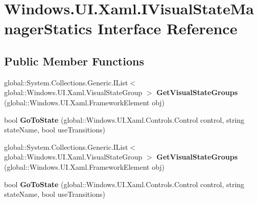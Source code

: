 \hypertarget{interface_windows_1_1_u_i_1_1_xaml_1_1_i_visual_state_manager_statics}{}\section{Windows.\+U\+I.\+Xaml.\+I\+Visual\+State\+Manager\+Statics Interface Reference}
\label{interface_windows_1_1_u_i_1_1_xaml_1_1_i_visual_state_manager_statics}
\subsection*{Public Member Functions}
\begin{DoxyCompactItemize}
\item 
\mbox{\label{interface_windows_1_1_u_i_1_1_xaml_1_1_i_visual_state_manager_statics_a558e618e26d67db8090e17d5499ddae1}} 
global\+::\+System.\+Collections.\+Generic.\+I\+List$<$ global\+::\+Windows.\+U\+I.\+Xaml.\+Visual\+State\+Group $>$ {\bfseries Get\+Visual\+State\+Groups} (global\+::\+Windows.\+U\+I.\+Xaml.\+Framework\+Element obj)
\item 
\mbox{\label{interface_windows_1_1_u_i_1_1_xaml_1_1_i_visual_state_manager_statics_a770de5eb5679fcbc1892580b35f8f030}} 
bool {\bfseries Go\+To\+State} (global\+::\+Windows.\+U\+I.\+Xaml.\+Controls.\+Control control, string state\+Name, bool use\+Transitions)
\item 
\mbox{\label{interface_windows_1_1_u_i_1_1_xaml_1_1_i_visual_state_manager_statics_a558e618e26d67db8090e17d5499ddae1}} 
global\+::\+System.\+Collections.\+Generic.\+I\+List$<$ global\+::\+Windows.\+U\+I.\+Xaml.\+Visual\+State\+Group $>$ {\bfseries Get\+Visual\+State\+Groups} (global\+::\+Windows.\+U\+I.\+Xaml.\+Framework\+Element obj)
\item 
\mbox{\label{interface_windows_1_1_u_i_1_1_xaml_1_1_i_visual_state_manager_statics_a770de5eb5679fcbc1892580b35f8f030}} 
bool {\bfseries Go\+To\+State} (global\+::\+Windows.\+U\+I.\+Xaml.\+Controls.\+Control control, string state\+Name, bool use\+Transitions)

\end{DoxyCompactItemize}
